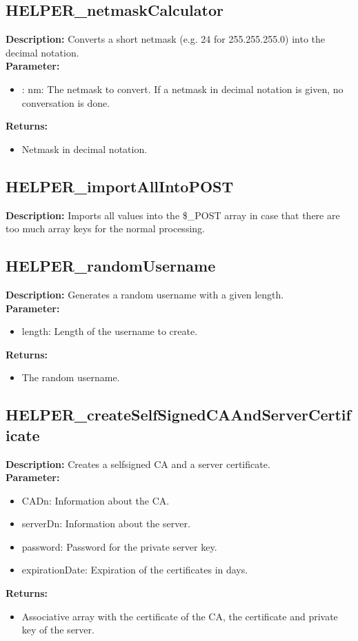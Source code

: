 \subsection{HELPER\_netmaskCalculator}
\textbf{Description:} Converts a short netmask (e.g. 24 for 255.255.255.0) into the decimal notation.\\
\textbf{Parameter:}
\begin{itemize}
\item : nm: The netmask to convert. If a netmask in decimal notation is given, no conversation is done.
\end{itemize}
\textbf{Returns:}
\begin{itemize}
\item Netmask in decimal notation.
\end{itemize}

\subsection{HELPER\_importAllIntoPOST}
\textbf{Description:} Imports all values into the \$\_POST array in case that there are too much array keys for the normal processing.\\

\subsection{HELPER\_randomUsername}
\textbf{Description:} Generates a random username with a given length.\\
\textbf{Parameter:}
\begin{itemize}
\item length: Length of the username to create.
\end{itemize}
\textbf{Returns:}
\begin{itemize}
\item The random username.
\end{itemize}

\subsection{HELPER\_createSelfSignedCAAndServerCertificate}
\textbf{Description:} Creates a selfsigned CA and a server certificate.\\
\textbf{Parameter:}
\begin{itemize}
\item CADn: Information about the CA.
\item serverDn: Information about the server.
\item password: Password for the private server key.
\item expirationDate: Expiration of the certificates in days.
\end{itemize}
\textbf{Returns:}
\begin{itemize}
\item Associative array with the certificate of the CA, the certificate and private key of the server.
\end{itemize}

